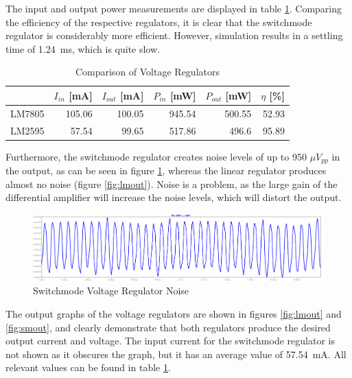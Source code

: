 The input and output power measurements are displayed in table \ref{tab:compvreg}. Comparing the efficiency of the respective regulators, it is clear that the switchmode regulator is considerably more efficient. However, simulation results in a settling time of \SI{1.24}{ms}, which is quite slow. 

\begin{table}
        \centering
        \footnotesize
        \caption{Comparison of Voltage Regulators}
         \begin{tabular}{c@{\qquad}rrrrr}
          \toprule
             & $I_{in}$ [mA] & $I_{out}$ [mA] & $P_{in}$ [mW] & $P_{out}$ [mW] & $\eta$ [\%] \\
          \midrule
          LM7805 	& 105.06 	& 100.05 	& 945.54 	& 500.55 	& 52.93\\
          LM2595 	& 57.54 	& 99.65 	& 517.86 	& 496.6 	& 95.89\\
          \bottomrule
        \end{tabular}
     \label{tab:compvreg}
\end{table}

Furthermore, the switchmode regulator creates noise levels of up to 950 $\mu V_{pp}$ in the output, as can be seen in figure \ref{fig:smnoise}, whereas the linear regulator produces almost no noise (figure \ref{fig:lmout}). Noise is a problem, as the large gain of the differential amplifier  will increase the noise levels, which will distort the output. 

\begin{figure}[h]
    \centering
    \includegraphics[width = 1\textwidth]{Figures/smnoise.png}
    \caption{Switchmode Voltage Regulator Noise}
    \label{fig:smnoise}
\end{figure}


The output graphs of the voltage regulators are shown in figures \ref{fig:lmout} and \ref{fig:smout}, and clearly demonstrate that both regulators produce the desired output current and voltage. The input current for the switchmode regulator is not shown as it obscures the graph, but it has an average value of \SI{57.54}{mA}. All relevant values can be found in table \ref{tab:compvreg}.

